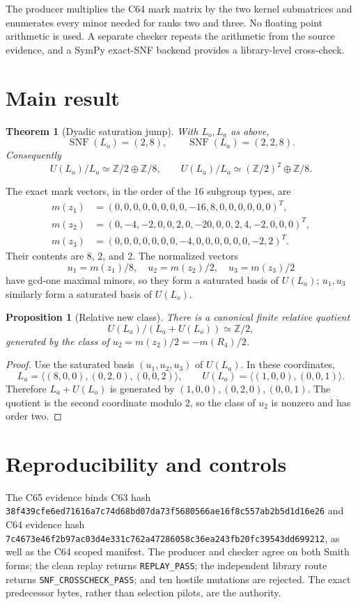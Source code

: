 \documentclass[10pt]{article}
\newtheorem{theorem}{Theorem}
\newtheorem{proposition}{Proposition}
\begin{document}
The producer multiplies the C64 mark matrix by the two kernel submatrices and
enumerates every minor needed for ranks two and three.  No floating point
arithmetic is used.  A separate checker repeats the arithmetic from the
source evidence, and a SymPy exact-SNF backend provides a library-level
cross-check.

\section{Main result}
\begin{theorem}[Dyadic saturation jump]
With $L_o,L_a$ as above,
\[
 \operatorname{SNF}(L_o)=(2,8),\qquad
 \operatorname{SNF}(L_a)=(2,2,8).
\]
Consequently
\[
 U(L_o)/L_o\simeq\mathbb Z/2\oplus\mathbb Z/8,
 \qquad
 U(L_a)/L_a\simeq(\mathbb Z/2)^2\oplus\mathbb Z/8.
\]
\end{theorem}

The exact mark vectors, in the order of the 16 subgroup types, are
\[
\begin{aligned}
m(z_1)&=(0,0,0,0,0,0,0,0,-16,8,0,0,0,0,0,0)^T,\\
m(z_2)&=(0,-4,-2,0,0,2,0,-20,0,0,2,4,-2,0,0,0)^T,\\
m(z_3)&=(0,0,0,0,0,0,0,-4,0,0,0,0,0,0,-2,2)^T.
\end{aligned}
\]
Their contents are 8, 2, and 2.  The normalized vectors
\[
 u_1=m(z_1)/8,\quad u_2=m(z_2)/2,\quad u_3=m(z_3)/2
\]
have gcd-one maximal minors, so they form a saturated basis of $U(L_a)$;
$u_1,u_3$ similarly form a saturated basis of $U(L_o)$.

\begin{proposition}[Relative new class]
There is a canonical finite relative quotient
\[
 U(L_a)/(L_a+U(L_o))\simeq\mathbb Z/2,
\]
generated by the class of $u_2=m(z_2)/2=-m(R_4)/2$.
\end{proposition}

\begin{proof}
Use the saturated basis $(u_1,u_2,u_3)$ of $U(L_a)$.  In these coordinates,
\[
 L_a=\langle(8,0,0),(0,2,0),(0,0,2)\rangle,\qquad
 U(L_o)=\langle(1,0,0),(0,0,1)\rangle.
\]
Therefore $L_a+U(L_o)$ is generated by
$(1,0,0),(0,2,0),(0,0,1)$.  The quotient is the second coordinate modulo
2, so the class of $u_2$ is nonzero and has order two.
\end{proof}

\section{Reproducibility and controls}
The C65 evidence binds C63 hash
\texttt{38f439cfe6ed71616a7c74d68bd07da73f5680566ae16f8c557ab2b5d1d16e26}
and C64 evidence hash
\texttt{7c4673e46f2b97ac03d4e331c762a47286058c36ea243fb20fc39543dd699212},
as well as the C64 scoped manifest.  The producer and checker agree on both
Smith forms; the clean replay returns \texttt{REPLAY\_PASS}; the independent
library route returns \texttt{SNF\_CROSSCHECK\_PASS}; and ten hostile
mutations are rejected.  The exact predecessor bytes, rather than selection
pilots, are the authority.
\end{document}
